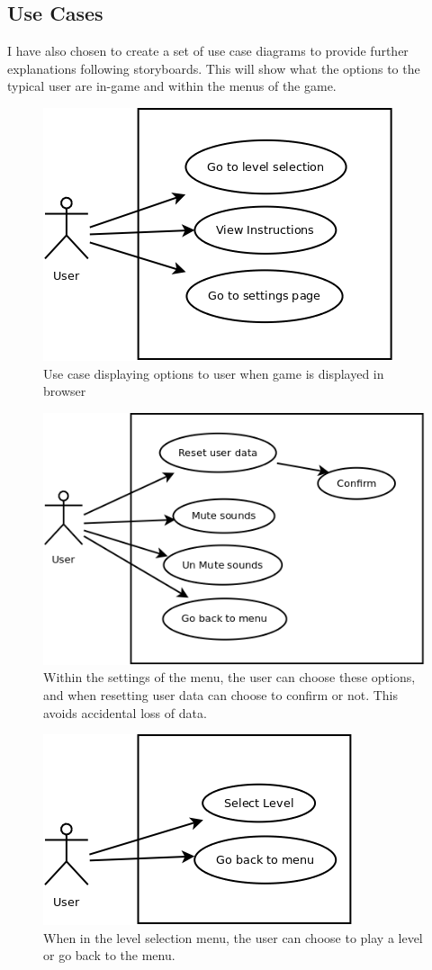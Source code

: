 \documentclass[a4paper]{article}
\begin{document}
\clearpage
\subsection{Use Cases}
I have also chosen to create a set of use case diagrams to provide further
explanations following storyboards. This will show what the options to the
typical user are in-game and within the menus of the game.
\begin{figure}[!ht]
   \centering
   \includegraphics[scale=0.5]{usecase1.png}
  \caption{Use case displaying options to user when game is displayed in
browser}
   \end{figure}
   \begin{figure}[!ht]
   \centering
   \includegraphics[scale=0.5]{usecase2.png}
  \caption{Within the settings of the menu, the user can choose these options,
and when resetting user data can choose to confirm or not. This avoids
accidental loss of data.}
   \end{figure}
   \begin{figure}[!ht]
   \centering
   \includegraphics[scale=0.5]{usecase3.png}
  \caption{When in the level selection menu, the user can choose to play a level
or go back to the menu.}
   \end{figure}
\end{document}
